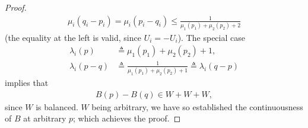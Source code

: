 \begin{proof}
\begin{align}
  \mu_i(q_i -p_i) = \mu_i(p_i -q_i) \leq \frac{1}{\mu_1(p_1)+\mu_2(p_2)+2} 
\end{align}
(the equality at the left is valid, since $U_i = -U_i$). %
The special case %
\begin{align}
  \lambda_i(p)   &\triangleq  \mu_1(p_1) + \mu_2(p_2) + 1, \\
  \lambda_i(p-q) &\triangleq  \frac{1}{\mu_1(p_1) + \mu_2(p_2) + 1} %
    \triangleq  \lambda_i(q-p) 
\end{align}
implies that %
%
\begin{align}
  B(p) - B(q)  \in W + W+ W, 
\end{align}    
%
since $W$ is balanced. %
%
$W$ being arbitrary, we have so established the continuousness of $B$ at %
arbitrary $p$; which achieves the proof.
\end{proof}
